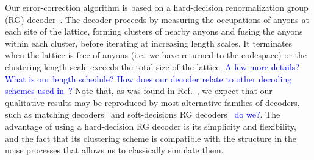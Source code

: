 \documentclass[aps, prl, letterpaper, twocolumn, superscriptaddress, notitlepage, 10pt]{revtex4-1}
\newcommand{\cggb}[1]{\textcolor{blue}{#1}}
\begin{document}
Our error-correction algorithm is based on a hard-decision renormalization group (RG) 
decoder~\cite{Bravyi2011}. 
The decoder proceeds by measuring the occupations of 
anyons at each site of the lattice, forming clusters of nearby anyons and fusing the anyons 
within each cluster, before iterating at increasing length scales.
It terminates when the lattice 
is free of anyons (i.e.~we have returned to the codespace) or the clustering length scale 
exceeds the total size of the lattice.
\cggb{A few more details? What is our length schedule?} 
\cggb{How does our decoder relate to other decoding schemes used in~\cite{Wootton2013,Brell2013,Hutter2014}?} 
Note that, as was found in Ref.~\cite{Brell2013}, we expect that our qualitative results may be reproduced by most alternative families of decoders, such as matching decoders~\cite{?} and soft-decisions 
RG decoders~\cite{?} \cggb{do we?}.
The advantage of using a hard-decision RG decoder is 
its simplicity and flexibility, and the fact that its clustering scheme is compatible with the structure in the noise processes that allows us to classically simulate them.
\end{document}
